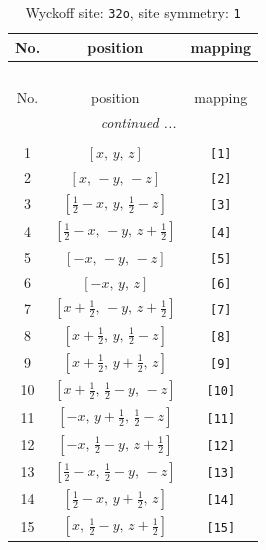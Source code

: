 \documentclass[fleqn,8pt]{jsarticle}
\begin{document}
\renewcommand{\arraystretch}{1.2}
\begin{longtable}{ccc}
\caption{Wyckoff site: {\tt 32o}, site symmetry: {\tt 1}}
 \\
 \hline \hline
No. & position & mapping \\ \hline \endfirsthead

\multicolumn{2}{l}{\tablename\ \thetable{}} \\
 \hline \hline
No. & position & mapping \\ \hline \endhead

 \hline \hline
\multicolumn{2}{r}{\footnotesize\it continued ...} \\ \endfoot

 \hline \hline
\multicolumn{2}{r}{} \\ \endlastfoot

1 & $\left[ x,\, y,\, z \right]$ & {\tt [1]} \\ \hline
2 & $\left[ x,\, - y,\, - z \right]$ & {\tt [2]} \\ \hline
3 & $\left[ \frac{1}{2} - x,\, y,\, \frac{1}{2} - z \right]$ & {\tt [3]} \\ \hline
4 & $\left[ \frac{1}{2} - x,\, - y,\, z + \frac{1}{2} \right]$ & {\tt [4]} \\ \hline
5 & $\left[ - x,\, - y,\, - z \right]$ & {\tt [5]} \\ \hline
6 & $\left[ - x,\, y,\, z \right]$ & {\tt [6]} \\ \hline
7 & $\left[ x + \frac{1}{2},\, - y,\, z + \frac{1}{2} \right]$ & {\tt [7]} \\ \hline
8 & $\left[ x + \frac{1}{2},\, y,\, \frac{1}{2} - z \right]$ & {\tt [8]} \\ \hline
9 & $\left[ x + \frac{1}{2},\, y + \frac{1}{2},\, z \right]$ & {\tt [9]} \\ \hline
10 & $\left[ x + \frac{1}{2},\, \frac{1}{2} - y,\, - z \right]$ & {\tt [10]} \\ \hline
11 & $\left[ - x,\, y + \frac{1}{2},\, \frac{1}{2} - z \right]$ & {\tt [11]} \\ \hline
12 & $\left[ - x,\, \frac{1}{2} - y,\, z + \frac{1}{2} \right]$ & {\tt [12]} \\ \hline
13 & $\left[ \frac{1}{2} - x,\, \frac{1}{2} - y,\, - z \right]$ & {\tt [13]} \\ \hline
14 & $\left[ \frac{1}{2} - x,\, y + \frac{1}{2},\, z \right]$ & {\tt [14]} \\ \hline
15 & $\left[ x,\, \frac{1}{2} - y,\, z + \frac{1}{2} \right]$ & {\tt [15]} \\ \hline

\end{longtable}
\end{document}
